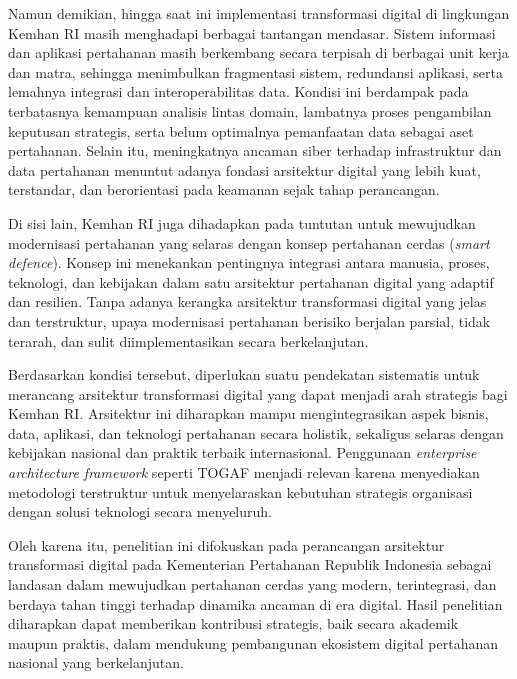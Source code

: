 Namun demikian, hingga saat ini implementasi transformasi digital di lingkungan Kemhan RI masih menghadapi berbagai tantangan mendasar.
Sistem informasi dan aplikasi pertahanan masih berkembang secara terpisah di berbagai unit kerja dan matra, sehingga menimbulkan fragmentasi sistem, redundansi aplikasi, serta lemahnya integrasi dan interoperabilitas data.
Kondisi ini berdampak pada terbatasnya kemampuan analisis lintas domain, lambatnya proses pengambilan keputusan strategis, serta belum optimalnya pemanfaatan data sebagai aset pertahanan.
Selain itu, meningkatnya ancaman siber terhadap infrastruktur dan data pertahanan menuntut adanya fondasi arsitektur digital yang lebih kuat, terstandar, dan berorientasi pada keamanan sejak tahap perancangan.

Di sisi lain, Kemhan RI juga dihadapkan pada tuntutan untuk mewujudkan modernisasi pertahanan yang selaras dengan konsep pertahanan cerdas (\textit{smart defence}).
Konsep ini menekankan pentingnya integrasi antara manusia, proses, teknologi, dan kebijakan dalam satu arsitektur pertahanan digital yang adaptif dan resilien.
Tanpa adanya kerangka arsitektur transformasi digital yang jelas dan terstruktur, upaya modernisasi pertahanan berisiko berjalan parsial, tidak terarah, dan sulit diimplementasikan secara berkelanjutan.

Berdasarkan kondisi tersebut, diperlukan suatu pendekatan sistematis untuk merancang arsitektur transformasi digital yang dapat menjadi arah strategis bagi Kemhan RI.
Arsitektur ini diharapkan mampu mengintegrasikan aspek bisnis, data, aplikasi, dan teknologi pertahanan secara holistik, sekaligus selaras dengan kebijakan nasional dan praktik terbaik internasional.
Penggunaan \textit{enterprise architecture framework} seperti TOGAF menjadi relevan karena menyediakan metodologi terstruktur untuk menyelaraskan kebutuhan strategis organisasi dengan solusi teknologi secara menyeluruh.

Oleh karena itu, penelitian ini difokuskan pada perancangan arsitektur transformasi digital pada Kementerian Pertahanan Republik Indonesia sebagai landasan dalam mewujudkan pertahanan cerdas yang modern, terintegrasi, dan berdaya tahan tinggi terhadap dinamika ancaman di era digital.
Hasil penelitian diharapkan dapat memberikan kontribusi strategis, baik secara akademik maupun praktis, dalam mendukung pembangunan ekosistem digital pertahanan nasional yang berkelanjutan.

